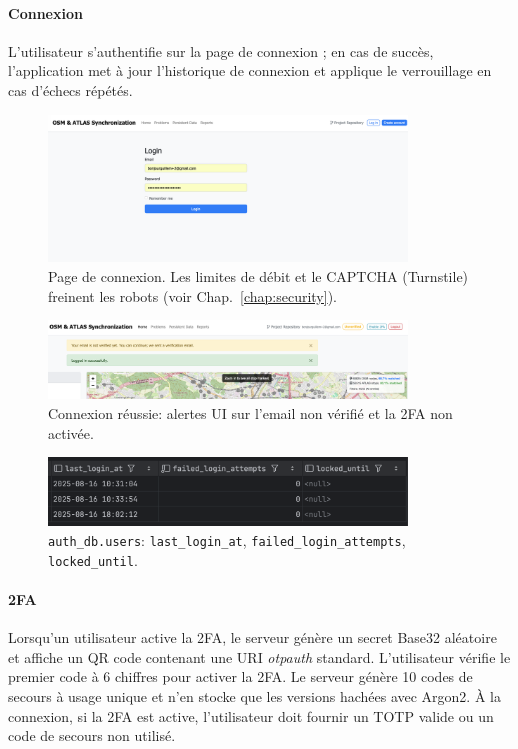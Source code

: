 \begin{itemize}
\paragraph{Connexion}
L'utilisateur s'authentifie sur la page de connexion ; en cas de succès, l'application met à jour l'historique de connexion et applique le verrouillage en cas d'échecs répétés.

\begin{figure}[h]
  \centering
  \includegraphics[width=0.85\textwidth]{../figures/chap10/login_page.png}
  \caption{Page de connexion. Les limites de débit et le CAPTCHA (Turnstile) freinent les robots (voir Chap.~\ref{chap:security}).}
\end{figure}

\begin{figure}[h]
  \centering
  \includegraphics[width=0.85\textwidth]{../figures/chap10/login_succesful.png}
  \caption{Connexion réussie: alertes UI sur l'email non vérifié et la 2FA non activée.}
\end{figure}

\begin{figure}[h]
  \centering
  \includegraphics[width=0.85\textwidth]{../figures/chap10/auth_db4.png}
  \caption{\texttt{auth\_db.users}: \texttt{last\_login\_at}, \texttt{failed\_login\_attempts}, \texttt{locked\_until}.}
\end{figure}

\paragraph{2FA}
Lorsqu'un utilisateur active la 2FA, le serveur génère un secret Base32 aléatoire et affiche un QR code contenant une URI \textit{otpauth} standard. L'utilisateur vérifie le premier code à 6 chiffres pour activer la 2FA. Le serveur génère 10 codes de secours à usage unique et n'en stocke que les versions hachées avec Argon2. À la connexion, si la 2FA est active, l'utilisateur doit fournir un TOTP valide ou un code de secours non utilisé.


\end{itemize}
